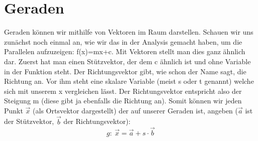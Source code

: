 \section{Geraden}
Geraden können wir mithilfe von Vektoren im Raum darstellen. Schauen wir uns zunächst noch einmal an, wie wir das in der Analysis gemacht haben, um die Parallelen aufzuzeigen: f(x)=mx+c. Mit Vektoren stellt man dies ganz ähnlich dar. Zuerst hat man einen Stützvektor, der dem c ähnlich ist und ohne Variable in der Funktion steht. Der Richtungsvektor gibt, wie schon der Name sagt, die Richtung an. Vor ihm steht eine skalare Variable (meist s oder t genannt) welche sich mit unserem x vergleichen lässt. Der Richtungsvektor entspricht also der Steigung m (diese gibt ja ebenfalls die Richtung an). Somit können wir jeden Punkt \(\vec{x}\) (als Ortsvektor dargestellt) der auf unserer Geraden ist, angeben (\(\vec{a}\) ist der Stützvektor, \(\vec{b}\) der Richtungsvektor):
\[g:\ \vec{x}=\vec{a}+s\cdot \vec{b}\]
 
